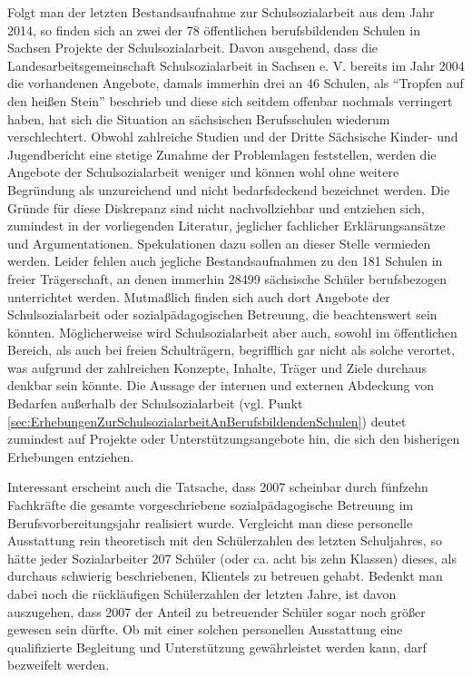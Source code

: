 Folgt man der letzten Bestandsaufnahme zur Schulsozialarbeit aus dem Jahr 2014, so finden sich an zwei der 78 öffentlichen berufsbildenden Schulen in Sachsen Projekte der Schulsozialarbeit. Davon ausgehend, dass die Landesarbeitsgemeinschaft Schulsozialarbeit in Sachsen e. V. bereits im Jahr 2004 die vorhandenen Angebote, damals immerhin drei an 46 Schulen, als "`Tropfen auf den heißen Stein"' beschrieb und diese sich seitdem offenbar nochmals verringert haben, hat sich die Situation an sächsischen Berufsschulen wiederum verschlechtert. Obwohl zahlreiche Studien und der Dritte Sächsische Kinder- und Jugendbericht eine stetige Zunahme der Problemlagen feststellen, werden die Angebote der Schulsozialarbeit weniger und können wohl ohne weitere Begründung als unzureichend und nicht bedarfsdeckend bezeichnet werden. Die Gründe für diese Diskrepanz sind nicht nachvollziehbar und entziehen sich, zumindest in der vorliegenden Literatur, jeglicher fachlicher Erklärungsansätze und Argumentationen. Spekulationen dazu sollen an dieser Stelle vermieden werden. Leider fehlen auch jegliche Bestandsaufnahmen zu den 181 Schulen in freier Trägerschaft, an denen immerhin 28499 sächsische Schüler berufsbezogen unterrichtet werden. Mutmaßlich finden sich auch dort Angebote der Schulsozialarbeit oder sozialpädagogischen Betreuung, die beachtenswert sein könnten. Möglicherweise wird Schulsozialarbeit aber auch, sowohl im öffentlichen Bereich, als auch bei freien Schulträgern, begrifflich gar nicht als solche verortet, was aufgrund der zahlreichen Konzepte, Inhalte, Träger und Ziele durchaus denkbar sein könnte. Die Aussage der internen und externen Abdeckung von Bedarfen außerhalb der Schulsozialarbeit (vgl. Punkt \ref{sec:ErhebungenZurSchulsozialarbeitAnBerufsbildendenSchulen}) deutet zumindest auf Projekte oder Unterstützungsangebote hin, die sich den bisherigen Erhebungen entziehen. 

Interessant erscheint auch die Tatsache, dass 2007 scheinbar durch fünfzehn Fachkräfte die gesamte vorgeschriebene sozialpädagogische Betreuung im Berufsvorbereitungsjahr realisiert wurde. Vergleicht man diese personelle Ausstattung rein theoretisch mit den Schülerzahlen des letzten Schuljahres, so hätte jeder Sozialarbeiter 207 Schüler (oder ca. acht bis zehn Klassen) dieses, als durchaus schwierig beschriebenen, Klientels zu betreuen gehabt. Bedenkt man dabei noch die rückläufigen Schülerzahlen der letzten Jahre, ist davon auszugehen, dass 2007 der Anteil zu betreuender Schüler sogar noch größer gewesen sein dürfte. Ob mit einer solchen personellen Ausstattung eine qualifizierte Begleitung und Unterstützung gewährleistet werden kann, darf bezweifelt werden.

